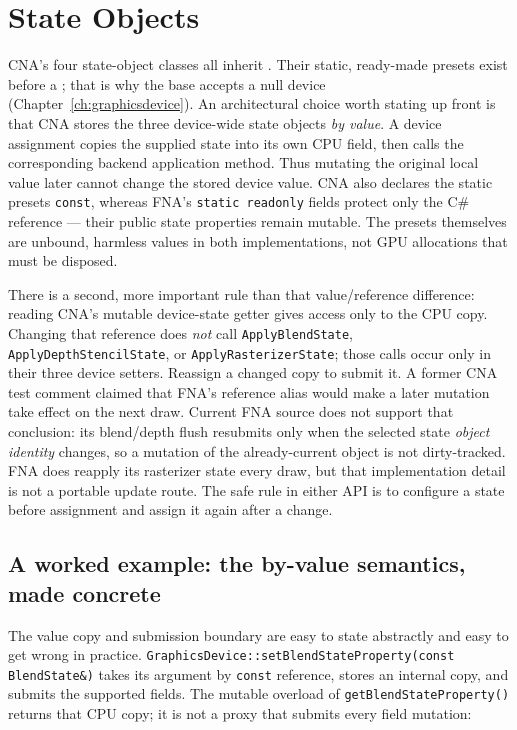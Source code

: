 \chapter{State Objects}
\label{ch:state-objects}

CNA's four state-object classes all inherit . Their static,
ready-made presets exist before a ; that is why the base accepts a null
device (Chapter~\ref{ch:graphicsdevice}). An architectural choice worth stating up front is that
CNA stores the three device-wide state objects \emph{by value}. A device assignment copies the
supplied state into its own CPU field, then calls the corresponding backend application method.
Thus mutating the original local value later cannot change the stored device value. CNA also
declares the static presets \texttt{const}, whereas
FNA's \texttt{static readonly} fields protect only the C\# reference --- their public state
properties remain mutable. The presets themselves are unbound, harmless 
values in both implementations, not GPU allocations that must be disposed.

There is a second, more important rule than that value/reference difference: reading CNA's
mutable device-state getter gives access only to the CPU copy. Changing that reference does
\emph{not} call \texttt{ApplyBlendState}, \texttt{ApplyDepthStencilState}, or
\texttt{ApplyRasterizerState}; those calls occur only in their three device setters. Reassign a
changed copy to submit it. A former CNA test comment claimed that FNA's reference alias would make
a later  mutation take effect on the next draw. Current FNA source does not
support that conclusion: its blend/depth flush resubmits only when the selected state \emph{object
identity} changes, so a mutation of the already-current object is not dirty-tracked. FNA does
reapply its rasterizer state every draw, but that implementation detail is not a portable update
route. The safe rule in either API is to configure a state before assignment and assign it again
after a change.

\section{A worked example: the by-value semantics, made concrete}

The value copy and submission boundary are easy to state abstractly and easy to get wrong in
practice. \texttt{GraphicsDevice::setBlendStateProperty(const BlendState\&)} takes its argument
by \texttt{const} reference, stores an internal copy, and submits the supported fields. The
mutable overload of \texttt{getBlendStateProperty()} returns that CPU copy; it is not a proxy that
submits every field mutation:


